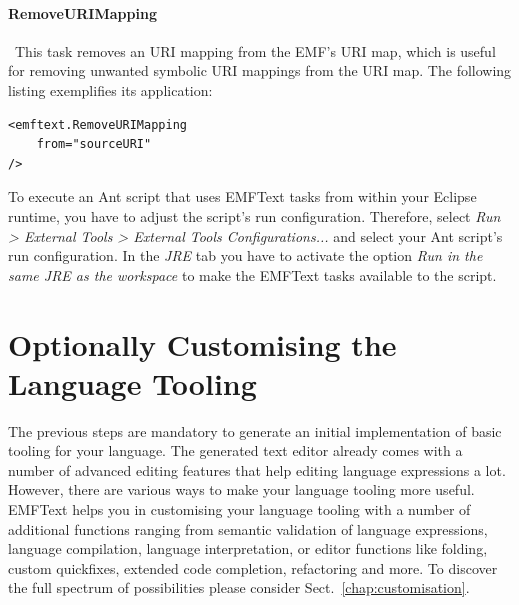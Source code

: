 \paragraph*{RemoveURIMapping}~This task removes an URI mapping from the EMF's
URI map, which is useful for removing unwanted symbolic URI mappings from the URI map. 
The following listing exemplifies its application: 
\lstset{language=XML}
\begin{lstlisting}
<emftext.RemoveURIMapping
	from="sourceURI"
/>
\end{lstlisting}
	
	
	To execute an Ant script that uses EMFText tasks from within your Eclipse
	runtime, you have to adjust the script's run configuration. Therefore, select 
	\emph{Run > External Tools > External Tools Configurations...} and select 
	your Ant script's run configuration. In the \emph{JRE} tab you have to
	activate the option \emph{Run in the same JRE as the workspace} to make the
	EMFText tasks available to the script.
	
\section{Optionally Customising the Language Tooling}

The previous steps are mandatory to generate an initial implementation of
basic tooling for your language. The generated text editor already
comes with a number of advanced editing features that help editing language
expressions a lot. However, there are various ways to make your language tooling
more useful. EMFText helps you in customising your language tooling with a
number of additional functions ranging from semantic validation of language
expressions, language compilation, language interpretation, or editor functions
like folding, custom quickfixes, extended code completion, refactoring and more.
To discover the full spectrum of possibilities please consider 
Sect.~\ref{chap:customisation}.
